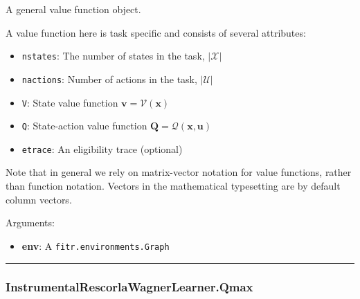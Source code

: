 \begin{Shaded}
\begin{Highlighting}[]
\end{Highlighting}
\end{Shaded}

A general value function object.

A value function here is task specific and consists of several
attributes:

\begin{itemize}
\tightlist
\item
  \texttt{nstates}: The number of states in the task, \(|\mathcal X|\)
\item
  \texttt{nactions}: Number of actions in the task, \(|\mathcal U|\)
\item
  \texttt{V}: State value function \(\mathbf v = \mathcal V(\mathbf x)\)
\item
  \texttt{Q}: State-action value function
  \(\mathbf Q = \mathcal Q(\mathbf x, \mathbf u)\)
\item
  \texttt{etrace}: An eligibility trace (optional)
\end{itemize}

Note that in general we rely on matrix-vector notation for value
functions, rather than function notation. Vectors in the mathematical
typesetting are by default column vectors.

Arguments:

\begin{itemize}
\tightlist
\item
  \textbf{env}: A \texttt{fitr.environments.Graph}
\end{itemize}

\begin{center}\rule{0.5\linewidth}{\linethickness}\end{center}

\hypertarget{instrumentalrescorlawagnerlearner.qmax}{%
\subsubsection{InstrumentalRescorlaWagnerLearner.Qmax}\label{instrumentalrescorlawagnerlearner.qmax}}

\begin{Shaded}
\begin{Highlighting}[]
\end{Highlighting}
\end{Shaded}

